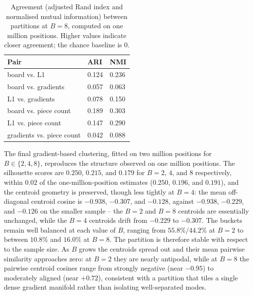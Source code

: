 \begin{table}[H]
\centering
\small
\begin{tabular}{lll}
\toprule
Pair & ARI & NMI \\
\midrule
board vs. L1 & 0.124 & 0.236 \\
board vs. gradients & 0.057 & 0.063 \\
L1 vs. gradients & 0.078 & 0.150 \\
board vs. piece count & 0.189 & 0.303 \\
L1 vs. piece count & 0.147 & 0.290 \\
gradients vs. piece count & 0.042 & 0.088 \\
\bottomrule
\end{tabular}
\caption{Agreement (adjusted Rand index and normalised mutual information) between partitions at $B=8$, computed on one million positions. Higher values indicate closer agreement; the chance baseline is $0$.}
\label{tab:5.4}
\end{table}

The final gradient-based clustering, fitted on two million positions for $B \in \{2, 4, 8\}$, reproduces the structure observed on one million positions. The silhouette scores are $0.250$, $0.215$, and $0.179$ for $B=2$, $4$, and $8$ respectively, within $0.02$ of the one-million-position estimates ($0.250$, $0.196$, and $0.191$), and the centroid geometry is preserved, though less tightly at $B=4$: the mean off-diagonal centroid cosine is $-0.938$, $-0.307$, and $-0.128$, against $-0.938$, $-0.229$, and $-0.126$ on the smaller sample -- the $B=2$ and $B=8$ centroids are essentially unchanged, while the $B=4$ centroids drift from $-0.229$ to $-0.307$. The buckets remain well balanced at each value of $B$, ranging from $55.8\%/44.2\%$ at $B=2$ to between $10.8\%$ and $16.0\%$ at $B=8$. The partition is therefore stable with respect to the sample size. As $B$ grows the centroids spread out and their mean pairwise similarity approaches zero: at $B=2$ they are nearly antipodal, while at $B=8$ the pairwise centroid cosines range from strongly negative (near $-0.95$) to moderately aligned (near $+0.72$), consistent with a partition that tiles a single dense gradient manifold rather than isolating well-separated modes.


